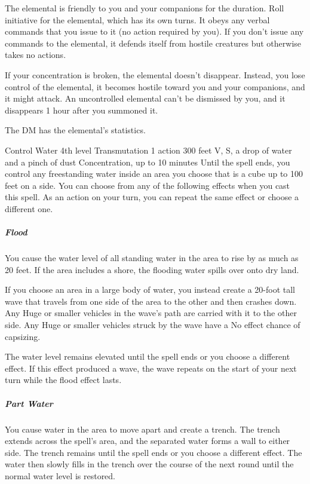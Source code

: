 \documentclass[10pt,a4paper,twoside,bg=print,twocolumn,openany,nodeprecatedcode]{dndbook}
\begin{document}
The elemental is friendly to you and your companions for the duration. Roll initiative for the elemental, which has its own turns. It obeys any verbal commands that you issue to it (no action required by you). If you don't issue any commands to the elemental, it defends itself from hostile creatures but otherwise takes no actions.

If your concentration is broken, the elemental doesn't disappear. Instead, you lose control of the elemental, it becomes hostile toward you and your companions, and it might attack. An uncontrolled elemental can't be dismissed by you, and it disappears 1 hour after you summoned it.

The DM has the elemental's statistics.



\DndSpellHeader%
{Control Water}
{4th level Transmutation}
{1 action}
{300 feet}
{V, S, a drop of water and a pinch of dust}
{Concentration, up to 10 minutes}
Until the spell ends, you control any freestanding water inside an area you choose that is a cube up to 100 feet on a side. You can choose from any of the following effects when you cast this spell. As an action on your turn, you can repeat the same effect or choose a different one.

\subparagraph{Flood}
You cause the water level of all standing water in the area to rise by as much as 20 feet. If the area includes a shore, the flooding water spills over onto dry land.

If you choose an area in a large body of water, you instead create a 20-foot tall wave that travels from one side of the area to the other and then crashes down. Any Huge or smaller vehicles in the wave's path are carried with it to the other side. Any Huge or smaller vehicles struck by the wave have a No effect chance of capsizing.

The water level remains elevated until the spell ends or you choose a different effect. If this effect produced a wave, the wave repeats on the start of your next turn while the flood effect lasts.

\subparagraph{Part Water}
You cause water in the area to move apart and create a trench. The trench extends across the spell's area, and the separated water forms a wall to either side. The trench remains until the spell ends or you choose a different effect. The water then slowly fills in the trench over the course of the next round until the normal water level is restored.
\end{document}
